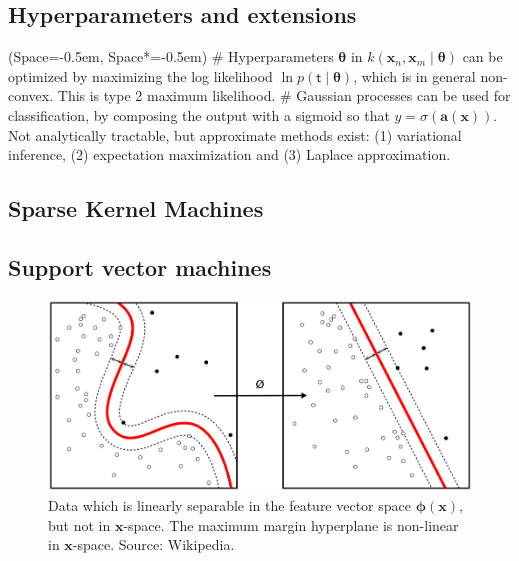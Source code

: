 \documentclass[12pt, a4paper]{article}
\newcommand{\listSpace}{-0.5em}%
\newcommand{\vect}[1]{\bm{#1}}
\begin{document}
\subsection*{Hyperparameters and extensions}
\begin{easylist}[itemize]
	\ListProperties(Space=\listSpace, Space*=\listSpace)
	# Hyperparameters $\vect{\theta}$ in $k(\vect{x}_n, \vect{x}_m \mid \vect{\theta})$ can be optimized by maximizing the log likelihood $\ln p (\mathsf{t} \mid \vect{\theta})$, which is in general non-convex.
	This is type 2 maximum likelihood.
	# Gaussian processes can be used for classification, by composing the output with a sigmoid so that $y = \sigma (\vect{a}(\vect{x}))$.
	Not analytically tractable, but approximate methods exist: (1) variational inference, (2) expectation maximization and (3) Laplace approximation.
\end{easylist}

\subsection{Sparse Kernel Machines}


\subsection*{Support vector machines}

	\begin{figure}[ht!]
		\centering
		\includegraphics[width=0.7\linewidth]{figs/Kernel_Machine.png}
		\caption{Data which is linearly separable in the feature vector space $\vect{\phi}(\vect{x})$, but not in $\vect{x}$-space.
			The maximum margin hyperplane is non-linear in $\vect{x}$-space.
			Source: Wikipedia.}
		\label{fig:Kernel_Machine}
	\end{figure}
	
\end{document}
